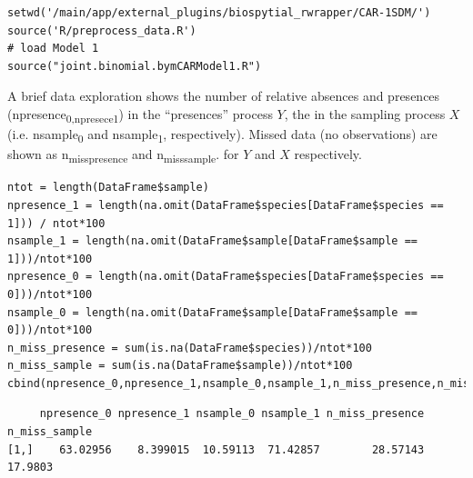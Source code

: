 \documentclass[11pt]{article}
\begin{document}
\begin{verbatim}
setwd('/main/app/external_plugins/biospytial_rwrapper/CAR-1SDM/')
source('R/preprocess_data.R')
# load Model 1
source("joint.binomial.bymCARModel1.R")
\end{verbatim}

A brief data exploration shows the number of relative absences and presences (npresence\textsubscript{0,npresece}\textsubscript{1}) in the ``presences'' process \(Y\), the in the sampling process \(X\)  (i.e. nsample\textsubscript{0} and nsample\textsubscript{1}, respectively). Missed data (no observations) are shown as n\textsubscript{miss}\textsubscript{presence} and n\textsubscript{miss}\textsubscript{sample}. for \(Y\) and \(X\) respectively.

\begin{verbatim}
ntot = length(DataFrame$sample)
npresence_1 = length(na.omit(DataFrame$species[DataFrame$species == 1])) / ntot*100
nsample_1 = length(na.omit(DataFrame$sample[DataFrame$sample == 1]))/ntot*100
npresence_0 = length(na.omit(DataFrame$species[DataFrame$species == 0]))/ntot*100
nsample_0 = length(na.omit(DataFrame$sample[DataFrame$sample == 0]))/ntot*100
n_miss_presence = sum(is.na(DataFrame$species))/ntot*100
n_miss_sample = sum(is.na(DataFrame$sample))/ntot*100
cbind(npresence_0,npresence_1,nsample_0,nsample_1,n_miss_presence,n_miss_sample)
\end{verbatim}

\begin{verbatim}
     npresence_0 npresence_1 nsample_0 nsample_1 n_miss_presence n_miss_sample
[1,]    63.02956    8.399015  10.59113  71.42857        28.57143       17.9803
\end{verbatim}
\end{document}
